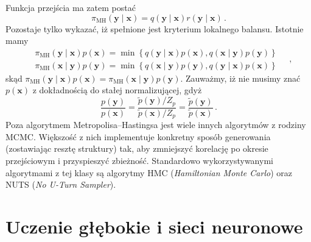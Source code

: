 \documentclass{myclass}
\numberwithin{equation}{subsection}
\begin{document}
Funkcja przejścia ma zatem postać
\begin{equation}
    \pi_\text{MH}(\mathbf{y}\mid\mathbf{x}) = q(\mathbf{y} \mid \mathbf{x}) r(\mathbf{y} \mid \mathbf{x})\,.
\end{equation}
Pozostaje tylko wykazać, iż spełnione jest kryterium lokalnego balansu. Istotnie mamy
\begin{equation}
    \begin{split}
        &\pi_\text{MH}(\mathbf{y}\mid\mathbf{x})p(\mathbf{x}) = \min\left\{q(\mathbf{y}\mid\mathbf{x})p(\mathbf{x}), q(\mathbf{x}\mid\mathbf{y})p(\mathbf{y})\right\}\\
        &\pi_\text{MH}(\mathbf{x}\mid\mathbf{y})p(\mathbf{y}) = \min\left\{q(\mathbf{x}\mid\mathbf{y})p(\mathbf{y}), q(\mathbf{y}\mid\mathbf{x})p(\mathbf{x})\right\}
    \end{split}\quad,
\end{equation}
skąd \(\pi_\text{MH}(\mathbf{y}\mid\mathbf{x})p(\mathbf{x}) =
\pi_\text{MH}(\mathbf{x}\mid\mathbf{y})p(\mathbf{y})\). Zauważmy, iż nie musimy znać
\(p(\mathbf{x})\) z dokładnością do stałej normalizującej, gdyż
\begin{equation}
    \frac{p(\mathbf{y})}{p(\mathbf{x})} = \frac{\tilde{p}(\mathbf{y})/Z_p}{\tilde{p}(\mathbf{x})/Z_p} =  \frac{\tilde{p}(\mathbf{y})}{\tilde{p}(\mathbf{x})}\,.
\end{equation}
Poza algorytmem Metropolisa--Hastingsa jest wiele innych algorytmów z rodziny MCMC. Większość z nich
implementuje konkretny sposób generowania (zostawiając resztę struktury) tak, aby zmniejszyć
korelację po okresie przejściowym i przyspieszyć zbieżność. Standardowo wykorzystywanymi algorytmami
z tej klasy są algorytmy HMC (\textit{Hamiltonian Monte Carlo}) oraz NUTS (\textit{No U-Turn
Sampler}).


\section{Uczenie głębokie i sieci neuronowe}

    
\end{document}
